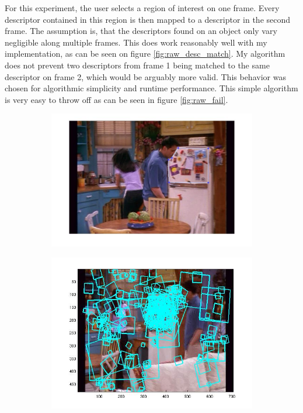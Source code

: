 \documentclass{paper}
\begin{document}
For this experiment, the user selects a region of interest on one frame. Every 
descriptor contained in this region is then mapped to a descriptor in the second frame.
The assumption is, that the descriptors found on an object only vary negligible along
multiple frames. This does work reasonably well with my implementation, as can be seen
on figure \ref{fig:raw_desc_match}. My algorithm does not prevent two descriptors from
frame 1 being matched to the same descriptor on frame 2, which would be arguably more
valid. This behavior was chosen for algorithmic simplicity and runtime performance. 
This simple algorithm is very easy to throw off as can be seen in figure \ref{fig:raw_fail}.
\begin{figure}
  \centering
  \begin{subfigure}[b]{0.7\textwidth}
    \includegraphics[width=\textwidth]{raw_desc_matching_selection}
  \end{subfigure}
  \begin{subfigure}[b]{0.7\textwidth}
    \includegraphics[width=\textwidth]{raw_desc_matching_all}

\end{subfigure}
\end{figure}
\end{document}
